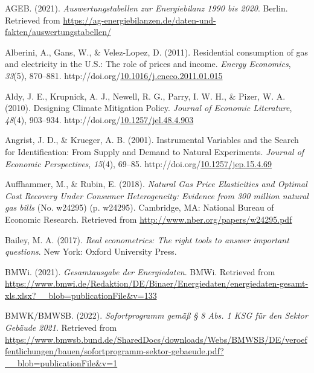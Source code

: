 \documentclass[12pt,twoside]{reedthesis}
\newlength{\cslhangindent}
\newenvironment{CSLReferences}[2] %
 {%
  \setlength{\parindent}{0pt}
  \ifodd #1 \everypar{\setlength{\hangindent}{\cslhangindent}}\ignorespaces\fi
  \ifnum #2 > 0
  \setlength{\parskip}{#2\baselineskip}
  \fi
 }%
 {}
\begin{document}
\hypertarget{refs}{}
\begin{CSLReferences}{1}{0}
\leavevmode{}%
AGEB. (2021). \emph{Auswertungstabellen zur Energiebilanz 1990 bis 2020}. Berlin. Retrieved from \url{https://ag-energiebilanzen.de/daten-und-fakten/auswertungstabellen/}

\leavevmode{}%
Alberini, A., Gans, W., \& Velez-Lopez, D. (2011). Residential consumption of gas and electricity in the U.S.: The role of prices and income. \emph{Energy Economics}, \emph{33}(5), 870--881. http://doi.org/\href{https://doi.org/10.1016/j.eneco.2011.01.015}{10.1016/j.eneco.2011.01.015}

\leavevmode{}%
Aldy, J. E., Krupnick, A. J., Newell, R. G., Parry, I. W. H., \& Pizer, W. A. (2010). Designing Climate Mitigation Policy. \emph{Journal of Economic Literature}, \emph{48}(4), 903--934. http://doi.org/\href{https://doi.org/10.1257/jel.48.4.903}{10.1257/jel.48.4.903}

\leavevmode{}%
Angrist, J. D., \& Krueger, A. B. (2001). Instrumental Variables and the Search for Identification: From Supply and Demand to Natural Experiments. \emph{Journal of Economic Perspectives}, \emph{15}(4), 69--85. http://doi.org/\href{https://doi.org/10.1257/jep.15.4.69}{10.1257/jep.15.4.69}

\leavevmode{}%
Auffhammer, M., \& Rubin, E. (2018). \emph{Natural Gas Price Elasticities and Optimal Cost Recovery Under Consumer Heterogeneity: Evidence from 300 million natural gas bills} (No. w24295) (p. w24295). Cambridge, MA: National Bureau of Economic Research. Retrieved from \url{http://www.nber.org/papers/w24295.pdf}

\leavevmode{}%
Bailey, M. A. (2017). \emph{Real econometrics: The right tools to answer important questions}. New York: Oxford University Press.

\leavevmode{}%
BMWi. (2021). \emph{Gesamtausgabe der Energiedaten}. BMWi. Retrieved from \url{https://www.bmwi.de/Redaktion/DE/Binaer/Energiedaten/energiedaten-gesamt-xls.xlsx?__blob=publicationFile\&v=133}

\leavevmode{}%
BMWK/BMWSB. (2022). \emph{Sofortprogramm gemäß § 8 Abs. 1 KSG für den Sektor Gebäude 2021}. Retrieved from \url{https://www.bmwsb.bund.de/SharedDocs/downloads/Webs/BMWSB/DE/veroeffentlichungen/bauen/sofortprogramm-sektor-gebaeude.pdf?__blob=publicationFile\&v=1}


\end{CSLReferences}
\end{document}
